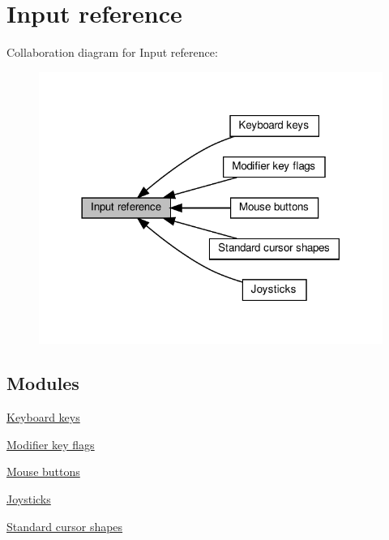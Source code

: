 \hypertarget{group__input}{}\section{Input reference}
\label{group__input}
Collaboration diagram for Input reference\+:
\nopagebreak
\begin{figure}[H]
\begin{center}
\leavevmode
\includegraphics[width=318pt]{group__input}
\end{center}
\end{figure}
\subsection*{Modules}
\begin{DoxyCompactItemize}
\item 
\hyperlink{group__keys}{Keyboard keys}
\item 
\hyperlink{group__mods}{Modifier key flags}
\item 
\hyperlink{group__buttons}{Mouse buttons}
\item 
\hyperlink{group__joysticks}{Joysticks}
\item 
\hyperlink{group__shapes}{Standard cursor shapes}
\end{DoxyCompactItemize}
